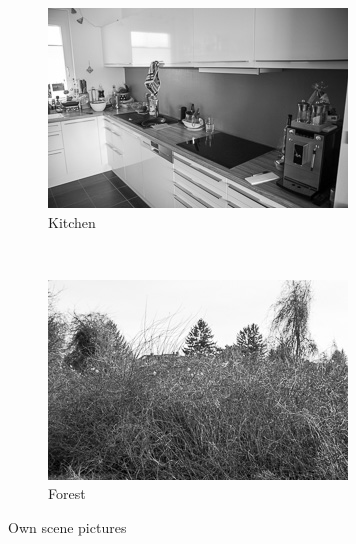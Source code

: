\documentclass[subfigure,epsfig,fleqn,float,numbers=noenddot]{scrartcl}
\begin{document}
\begin{figure}
				\begin{subfigure}[b]{0.3\textwidth}
                \includegraphics[width=\textwidth]{img/own/kitchen}
                \caption{Kitchen}
                \label{fig:kitchen}
        \end{subfigure}
				~
				\begin{subfigure}[b]{0.3\textwidth}
                \includegraphics[width=\textwidth]{img/own/forest}
                \caption{Forest}
                \label{fig:forest}
        \end{subfigure}
        \caption{Own scene pictures}\label{fig:ownimages}
\end{figure}
\end{document}
